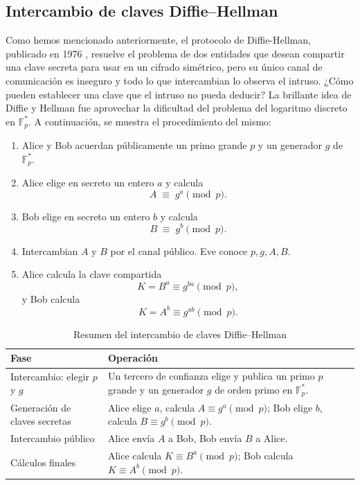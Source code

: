 \subsection{Intercambio de claves Diffie–Hellman}\label{sec:diffie_hellman}
Como hemos mencionado anteriormente, el protocolo de Diffie-Hellman, publicado en 1976 \cite{diffie-hellman}, resuelve el problema de dos entidades que desean compartir una clave secreta para usar en un cifrado simétrico, pero su único canal de comunicación es inseguro y todo lo que intercambian lo observa el intruso. ¿Cómo pueden establecer una clave que el intruso no pueda deducir? La brillante idea de Diffie y Hellman fue aprovechar la dificultad del problema del logaritmo discreto en \(\mathbb{F}_p^*\). A continuación, se muestra el procedimiento del mismo:

\begin{enumerate}
  \item Alice y Bob acuerdan públicamente un primo grande \(p\) y un generador \(g\) de \(\mathbb{F}_p^*\).  
  \item Alice elige en secreto un entero \(a\) y calcula
    \[
      A \;\equiv\; g^a \pmod p.
    \]
  \item Bob elige en secreto un entero \(b\) y calcula
    \[
      B \;\equiv\; g^b \pmod p.
    \]
  \item Intercambian \(A\) y \(B\) por el canal público. Eve conoce \(p,g,A,B\).  
  \item Alice calcula la clave compartida
    \[
      K = B^a \equiv g^{ba} \pmod p,
    \]
    y Bob calcula
    \[
      K = A^b \equiv g^{ab} \pmod p.
    \]
\end{enumerate}

\begin{table}[H]
  \centering
  \begin{tabular}{p{4cm}p{8cm}}
    \toprule
    \textbf{Fase} & \textbf{Operación} \\
    \midrule
    Intercambio: elegir $p$ y $g$ & Un tercero de confianza elige y publica un primo \(p\) grande y un generador \(g\) de orden primo en \(\mathbb{F}_p^*\). \\
    Generación de claves secretas  & Alice elige \(a\), calcula \(A\equiv g^a\pmod p\); Bob elige \(b\), calcula \(B\equiv g^b\pmod p\). \\
    Intercambio público & Alice envía \(A\) a Bob, Bob envía \(B\) a Alice. \\
    Cálculos finales    & Alice calcula \(K\equiv B^a\pmod p\); Bob calcula \(K\equiv A^b\pmod p\). \\
    \bottomrule
  \end{tabular}
  \caption{Resumen del intercambio de claves Diffie–Hellman}
  \label{tab:dh-algoritmo}
\end{table}

